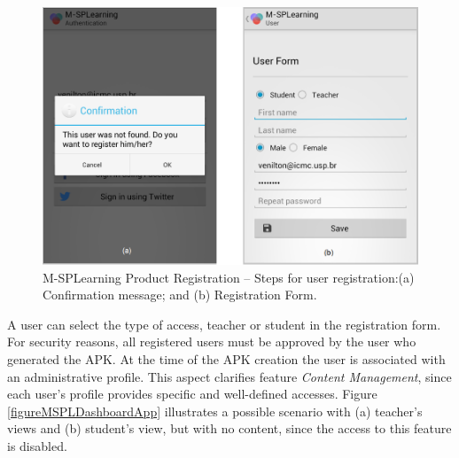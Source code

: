 \begin{figure}
\centering
\includegraphics[scale=0.33]{figures/section3/MSPLRegister}
\caption{M-SPLearning Product Registration -- Steps for user registration:\newline(a) Confirmation message; and (b) Registration Form.}
\label{figureMSPLRegister}
\vspace{0.65cm}
\end{figure}

A user can select the type of access, teacher or student in the registration form. For security reasons, all registered users must be approved by the user who generated the APK. At the time of the APK creation the user is associated with an administrative profile. This aspect clarifies feature \textit{Content Management}, since each user's profile provides specific and well-defined accesses. Figure \ref{figureMSPLDashboardApp} illustrates a possible scenario with (a) teacher's views and (b) student's view, but with no content, since the access to this feature is disabled.

